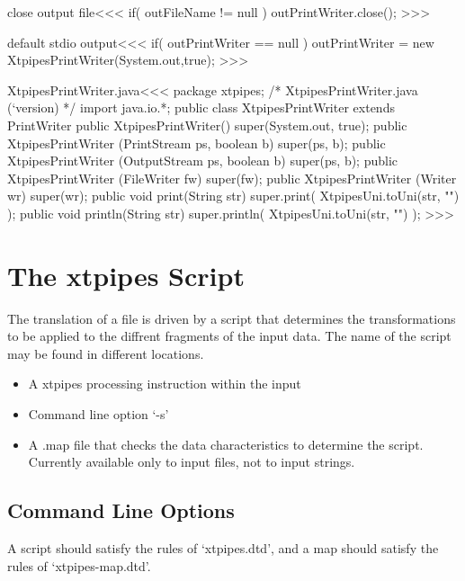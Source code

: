 \documentclass{article}
\begin{document}
{\<close output file\><<<
if( outFileName != null ){
   outPrintWriter.close(); 
}
>>>

\<default stdio output\><<<
if( outPrintWriter == null ){
   outPrintWriter = new XtpipesPrintWriter(System.out,true);
}
>>>


\<XtpipesPrintWriter.java\><<<
package xtpipes;
/*
XtpipesPrintWriter.java (`version)
*/
import java.io.*;
public class XtpipesPrintWriter extends PrintWriter {
   public XtpipesPrintWriter() {
     super(System.out, true);
   } 
   public XtpipesPrintWriter (PrintStream ps, boolean b){
     super(ps, b);
   }
   public XtpipesPrintWriter (OutputStream ps, boolean b){
     super(ps, b);
   }
   public XtpipesPrintWriter (FileWriter fw){
     super(fw);
   } 
   public XtpipesPrintWriter (Writer wr){
     super(wr);
   } 
   public void print(String str) {
     super.print( XtpipesUni.toUni(str, "") );
   } 
   public void println(String str) {
     super.println( XtpipesUni.toUni(str, "") );
}  } 
>>>





\section{The xtpipes Script}


The translation of a file is driven by a script that determines the
transformations to be applied to the diffrent fragments of the input
data.  The name of the script may be found in different locations.

\begin{itemize}
\item
A xtpipes processing instruction within the input
\item
Command line option `-s'
\item
A .map  file that checks the data characteristics to determine the
script. Currently available only to input files, not to input strings.
\end{itemize}



\subsection{Command Line Options}


A script should satisfy  the rules of `xtpipes.dtd',
and a map should satisfy the rules of `xtpipes-map.dtd'.




}
\end{document}
